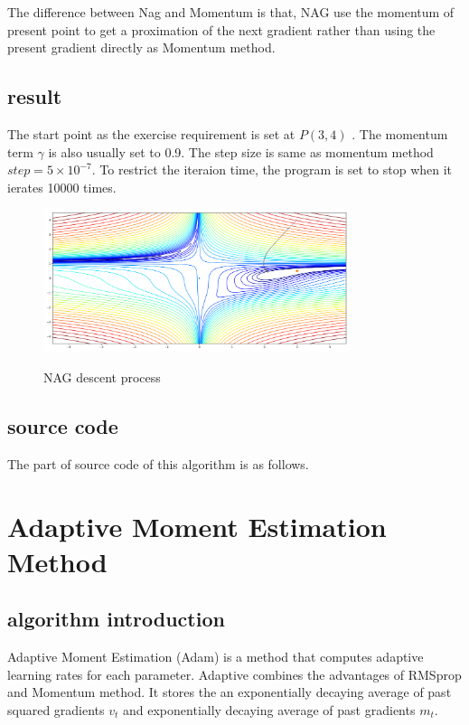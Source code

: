 \documentclass[aps,letterpaper,10pt]{article}
\begin{document}
The difference between Nag and Momentum is that,  NAG use the momentum of present point to get a proximation of the next gradient rather than using the present gradient directly as Momentum method.


\subsection{result}
The start point as the exercise requirement is set at $P(3,4)$ . The momentum term $\gamma$ is also usually set to 0.9. The step size is same as momentum method $step = 5\times10^{-7}$. To restrict the iteraion time, the program is set to stop when it ierates 10000 times.

  \begin{figure}[H]
    \centering
    \label{fig:nag}\includegraphics[width=0.8\textwidth]{nag.png}\
    \caption{NAG descent process}
  \end{figure}

\subsection{source code}
The part of source code of this algorithm is as follows.  \vspace{5mm}
  
	\vspace{3mm}


\newpage
\section{Adaptive Moment Estimation Method}
  \subsection{algorithm introduction}
  Adaptive Moment Estimation (Adam) is a method that computes adaptive learning rates for each parameter. Adaptive combines the advantages of RMSprop and Momentum method. It stores the an exponentially decaying average of past squared gradients $v_t$ and exponentially decaying average of past gradients $m_t$. \vspace{3mm}
\end{document}
